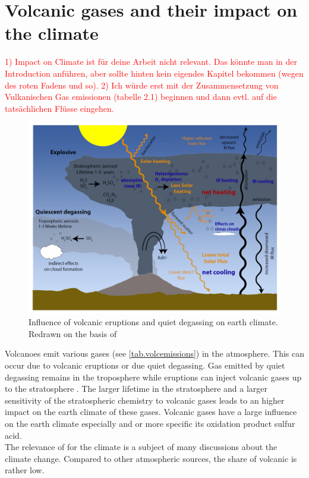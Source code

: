 \documentclass  [
  paper    = a4,
  BCOR     = 10mm,
  twoside,
  fontsize = 12pt,
  fleqn,
  toc      = bibnumbered,
  toc      = listofnumbered,
  numbers  = noendperiod,
  headings = normal,
  listof   = leveldown,
  version  = 3.03
]                                       {scrreprt}
\begin{document}
\section{Volcanic gases and their impact on the climate}
\textcolor{red}{1) Impact on Climate ist für deine Arbeit nicht relevant. Das könnte man in der Introduction anführen, aber sollte hinten kein eigendes Kapitel bekommen (wegen des roten Fadens und so). 2) Ich würde erst mit der Zusammensetzung von Vulkanischen Gas emissionen (tabelle 2.1) beginnen und dann evtl. auf die tatsächlichen Flüsse eingehen. }
\begin{figure}
	\centering
	\includegraphics[width=0.8\linewidth]{Bilder/Simon/Bilder_Tung/Climate_Influence}
	\caption{Influence of volcanic eruptions and quiet degassing on earth climate. Redrawn on the basis of \citet{robock2000volcanic}}
	\label{fig:climateinfluence}
\end{figure}
Volcanoes emit various gases (see \cref{tab.volcemissions}) in the atmosphere. This can occur due to volcanic eruptions or due quiet degassing. Gas emitted by quiet degassing remains in the troposphere while eruptions can inject volcanic gases up to the stratosphere \citet{robock2000volcanic}. The larger lifetime in the stratosphere and a larger sensitivity of the stratospheric chemistry to volcanic gases leads to an higher impact on the earth climate of these gases.
Volcanic gases have a large influence on the earth climate especially  and   or more specific its oxidation product sulfur acid.\\ 
The relevance of   for the climate is a subject of many discussions about the climate change. Compared to other atmospheric  sources, the share of volcanic   is rather low.\\
\end{document}

